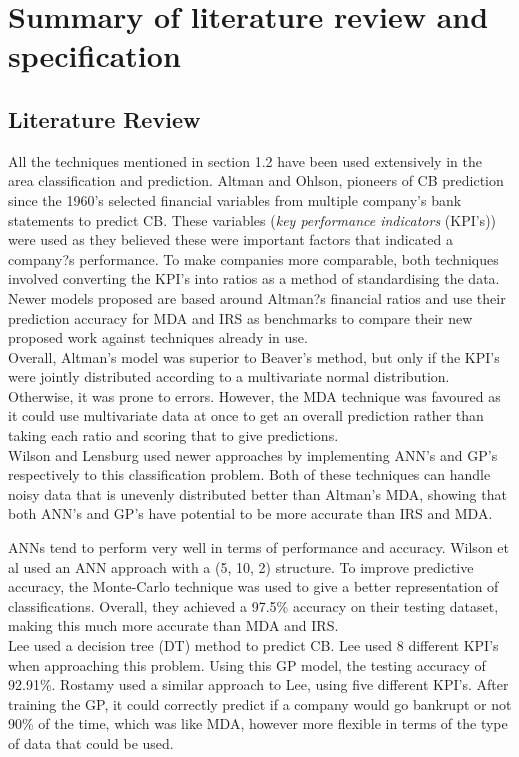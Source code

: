 \documentclass[11pt]{article}
\begin{document}
\section{Summary of literature review and specification}\label{sec:spec}
\subsection{Literature Review}
All the techniques mentioned in section 1.2 have been used extensively in the area classification and prediction. Altman and Ohlson\cite{?}, pioneers of CB prediction since the 1960's selected financial variables from multiple company's bank statements to predict CB. These variables (\textit{key performance indicators} (KPI's)) were used as they believed these were important factors that indicated a company?s performance. To make companies more comparable, both techniques involved converting the KPI's into ratios as a method of standardising the data. Newer models proposed are based around Altman?s financial ratios and use their prediction accuracy for MDA and IRS as benchmarks to compare their new proposed work against techniques already in use. \\

Overall, Altman's model was superior to Beaver's method, but only if the KPI's were jointly distributed according to a multivariate normal distribution\cite{?}. Otherwise, it was prone to errors. However, the MDA technique was favoured as it could use multivariate data at once to get an overall prediction rather than taking each ratio and scoring that to give predictions\cite{?}. \\
Wilson \cite{?}and Lensburg\cite{?} used newer approaches by implementing ANN's and GP's respectively to this classification problem. Both of these techniques can handle noisy data that is unevenly distributed better than Altman's MDA, showing that both ANN's and GP's have potential to be more accurate than IRS and MDA. 

ANNs tend to perform very well in terms of performance and accuracy. Wilson et al used an ANN approach with a (5, 10, 2) structure\cite{?}. To improve predictive accuracy, the Monte-Carlo technique was used to give a better representation of classifications. Overall, they achieved a 97.5\% accuracy on their testing dataset, making this much more accurate than MDA and IRS. \\
Lee used a decision tree (DT) method to predict CB\cite{?}. Lee used 8 different KPI's when approaching this problem. Using this GP model, the testing accuracy of 92.91\%. Rostamy\cite{?} used a similar approach to Lee, using five different KPI's. After training the GP, it could correctly predict if a company would go bankrupt or not 90\% of the time, which was like MDA, however more flexible in terms of the type of data that could be used.
\end{document}
